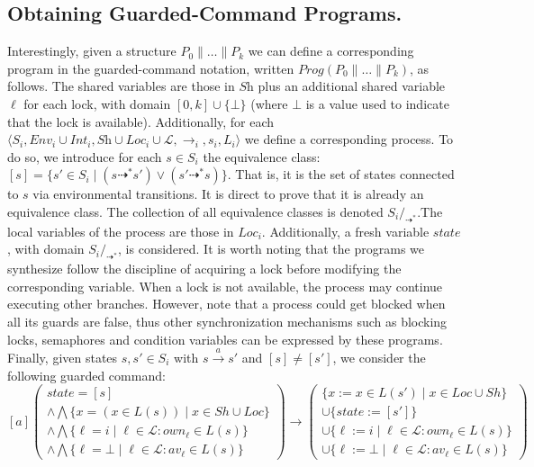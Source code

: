 \subsection{Obtaining Guarded-Command Programs.}
	Interestingly, given a structure $P_0 \parallel \dots \parallel P_k$  we can define a corresponding program in the guarded-command notation, written $Prog(P_0 \parallel \dots \parallel P_k)$, as follows. The shared variables are those in $\textit{Sh}$ plus an additional shared variable $\ell$ for each lock, with domain $[0,k]\cup\{\bot\}$ (where $\bot$ is a value used to indicate that the lock is available). Additionally, for each $\langle S_i, \textit{Env}_i \cup \textit{Int}_i, \textit{Sh} \cup \textit{Loc}_i \cup \mathcal{L},  \rightarrow_i, s_i, L_i \rangle$ we define a corresponding process. To do so, we introduce for each $s \in S_i$  the equivalence class: $[ s ]  = \{ s' \in S_i \mid (s \dashrightarrow^* s') \vee (s'  \dashrightarrow^* s)\}$. 
That is, it is the set of states connected to $s$ via environmental transitions. It is direct to prove that it is already an equivalence class. The collection of all equivalence classes
is denoted $S_i /_{\dashrightarrow^*}$.The local variables of the process are those in $\textit{Loc}_i$. Additionally, a fresh variable $\textit{state}$, with domain $S_i/_{\dashrightarrow^*}$, is considered. 
It is worth noting that the programs we synthesize follow the discipline of acquiring a lock before modifying the corresponding variable. When a lock is not available, the process may continue executing other branches. However, note that a process could get blocked when all its guards are false, thus other synchronization mechanisms such as blocking locks, semaphores and condition variables can be expressed by these programs. 
Finally, given states $s,s' \in S_i$ with $s \xrightarrow{a} s'$ and  $[s] \neq [s']$, we consider the following guarded command:
\[
 [a] \left( \begin{array}{l} 
 			 state = [s] \\
			 \wedge \bigwedge \{x = (x \in L(s)) \mid x \in \mathit{Sh} \cup \mathit{Loc} \}\\ 
			\wedge \bigwedge \{ \ell = i \mid \ell \in \mathcal{L} : \mathit{own}_\ell \in L(s)\}	 \\ 
			 \wedge \bigwedge \{ \ell = \bot \mid \ell \in \mathcal{L} : \mathit{av}_\ell \in L(s)\}  \end{array} \right) \rightarrow \left( \begin{array}{l} 
 																					  			  \{x {:=} x \in L(s') \mid x \in \mathit{Loc}\cup \mathit{Sh}\} \\ 
																					 			  \cup \{\mathit{state} {:=} [s'] \} \\
																								  \cup \{ \ell := i \mid \ell \in \mathcal{L} : \mathit{own}_\ell \in L(s)\}  \\
																								  \cup \{ \ell := \bot \mid \ell \in \mathcal{L} : \mathit{av}_\ell \in L(s)\}
																					  \end{array} \right)
\]
